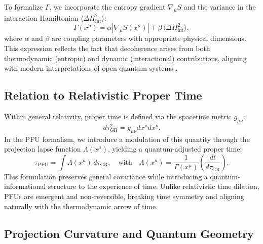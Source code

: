 \documentclass[12pt,a4paper]{article}
\numberwithin{equation}{section}
\begin{document}
To formalize $\Gamma$, we incorporate the entropy gradient $\nabla_\mu S$ and the variance in the interaction Hamiltonian $\langle \Delta H_{\text{int}}^2 \rangle$:
\begin{equation}
\label{eq:gamma_definition}
\Gamma(x^\mu) = \alpha \left| \nabla_\mu S(x^\mu) \right| + \beta \, \langle \Delta H_{\text{int}}^2 \rangle,
\end{equation}
where $\alpha$ and $\beta$ are coupling parameters with appropriate physical dimensions. This expression reflects the fact that decoherence arises from both thermodynamic (entropic) and dynamic (interactional) contributions, aligning with modern interpretations of open quantum systems \cite{zurek_decoherence_2003, schlosshauer_decoherence_2007}.

\subsection{Relation to Relativistic Proper Time}

Within general relativity, proper time is defined via the spacetime metric $g_{\mu\nu}$:
\begin{equation}
\label{eq:proper_time_gr}
d\tau_{\text{GR}}^2 = g_{\mu\nu} dx^\mu dx^\nu.
\end{equation}
In the PFU formalism, we introduce a modulation of this quantity through the projection lapse function $\Lambda(x^\mu)$, yielding a quantum-adjusted proper time:
\begin{equation}
\label{eq:tau_pfu}
\tau_{\text{PFU}} = \int \Lambda(x^\mu) \, d\tau_{\text{GR}}, \quad \text{with} \quad \Lambda(x^\mu) = \frac{1}{\Gamma(x^\mu)} \left( \frac{dt}{d\tau_{\text{GR}}} \right).
\end{equation}
This formulation preserves general covariance while introducing a quantum-informational structure to the experience of time. Unlike relativistic time dilation, PFUs are emergent and non-reversible, breaking time symmetry and aligning naturally with the thermodynamic arrow of time.

\subsection{Projection Curvature and Quantum Geometry}
\end{document}
